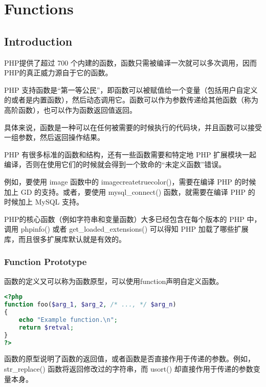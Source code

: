 \part{Functions}





\chapter{Introduction}


PHP提供了超过 700 个内建的函数，函数只需被编译一次就可以多次调用，因而PHP的真正威力源自于它的函数。

PHP 支持函数是“第一等公民”，即函数可以被赋值给一个变量（包括用户自定义的或者是内置函数），然后动态调用它。函数可以作为参数传递给其他函数（称为高阶函数），也可以作为函数返回值返回。

具体来说，函数是一种可以在任何被需要的时候执行的代码块，并且函数可以接受一组参数，然后返回操作结果。



PHP 有很多标准的函数和结构，还有一些函数需要和特定地 PHP 扩展模块一起编译，否则在使用它们的时候就会得到一个致命的“未定义函数”错误。

例如，要使用 image 函数中的 imagecreatetruecolor()，需要在编译 PHP 的时候加上 GD 的支持。或者，要使用 mysql\_connect() 函数，就需要在编译 PHP 的时候加上 MySQL 支持。

PHP的核心函数（例如字符串和变量函数）大多已经包含在每个版本的 PHP 中，调用 phpinfo() 或者 get\_loaded\_extensions() 可以得知 PHP 加载了哪些扩展库，而且很多扩展库默认就是有效的。







\section{Function Prototype}



函数的定义又可以称为函数原型，可以使用function声明自定义函数。

\begin{lstlisting}[language=PHP]
<?php
function foo($arg_1, $arg_2, /* ..., */ $arg_n)
{
    echo "Example function.\n";
    return $retval;
}
?>
\end{lstlisting}

函数的原型说明了函数的返回值，或者函数是否直接作用于传递的参数。例如， str\_replace() 函数将返回修改过的字符串，而 usort() 却直接作用于传递的参数变量本身。

